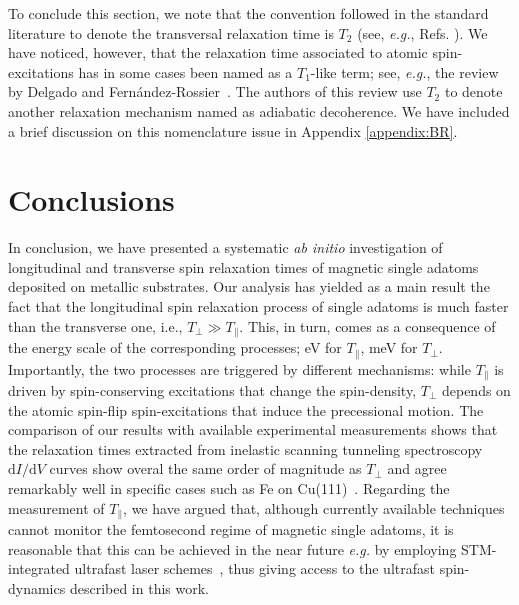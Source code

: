 \documentclass[prb,footinbib,showpacs,twocolumn,amsmath,amssymb]{revtex4}
\begin{document}
To conclude this section, 
we note that the convention followed in the standard literature to 
denote the transversal relaxation time is $T_{2}$
(see, \textit{e.g.}, Refs. ).
We have noticed, however, that the relaxation time associated to atomic spin-excitations
has in some cases been named as a $T_{1}$-like term;
see, \textit{e.g.}, 
the review by Delgado and Fern{\'a}ndez-Rossier~\cite{delgado_spin_2017}.
The authors of this review use $T_{2}$ to denote another relaxation mechanism named as
adiabatic decoherence. 
We have included a brief discussion on this nomenclature
issue in Appendix \ref{appendix:BR}.





\section{Conclusions}
\label{sec:discussion}


In conclusion, we have presented a systematic \textit{ab initio}
investigation of longitudinal and transverse spin relaxation times 
of  magnetic single adatoms deposited on metallic substrates. 
Our analysis has yielded as a main
result the fact that the longitudinal spin relaxation process  
of  single adatoms is much faster
than the transverse one, i.e., $T_{\perp}\gg T_{\parallel}$.
This, in turn, comes as a consequence of the energy scale of the corresponding
processes; eV for $T_{\parallel}$, meV for $T_{\perp}$. Importantly,  the two processes 
are triggered by different mechanisms:
while $T_{\parallel}$ is driven by spin-conserving 
excitations that change the spin-density, $T_{\perp}$ 
depends on the atomic spin-flip spin-excitations that induce   
the precessional motion.
The comparison of our results with available 
experimental measurements  shows that 
the relaxation times extracted from 
inelastic scanning tunneling spectroscopy $\mathrm{d}I/\mathrm{d}V$ 
curves show overal
the same order of magnitude as $T_{\perp}$ 
and agree remarkably well in
specific cases such as Fe on Cu(111)~\cite{PhysRevLett.106.037205}.
Regarding the measurement of $T_{\parallel}$, we have argued  that,
although currently available techniques
cannot monitor the femtosecond regime of magnetic single adatoms, 
it is reasonable that this can be achieved in the near future 
\textit{e.g.} by
employing STM-integrated ultrafast laser schemes~\cite{kruger_attosecond_2011,cocker_ultrafast_2013,cocker_tracking_2016},
thus giving access to the ultrafast spin-dynamics
described in this work. 
 
\end{document}
